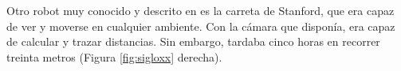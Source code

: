 

Otro robot muy conocido  y descrito en \cite{earnest2012stanfordcart} es la carreta de Stanford, que era capaz de ver y moverse en cualquier ambiente. Con la cámara que disponía, era capaz de calcular y trazar distancias. Sin embargo, tardaba cinco horas en recorrer treinta metros (Figura \ref{fig:sigloxx} derecha). 



